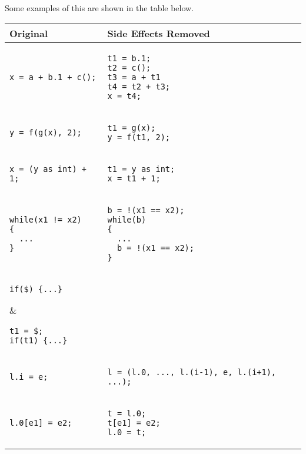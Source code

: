 \documentclass{llncs}
\providecommand{\tabularnewline}{\\}
\begin{document}
Some examples of this are shown in the table below.
\begin{center}
\begin{tabular}{|p{}|p{}|}
\hline 
\textbf{Original} & \textbf{Side Effects Removed} 
\tabularnewline
\hline \hline 
\begin{verbatim}
x = a + b.1 + c();
\end{verbatim} 
&
\begin{verbatim}
t1 = b.1;
t2 = c();   
t3 = a + t1
t4 = t2 + t3;
x = t4;
\end{verbatim}
\tabularnewline
\hline 

\begin{verbatim}
y = f(g(x), 2);
\end{verbatim} 
& 
\begin{verbatim}
t1 = g(x);
y = f(t1, 2);
\end{verbatim}
\tabularnewline
\hline 
\begin{verbatim}
x = (y as int) + 1;
\end{verbatim} 
& 
\begin{verbatim}
t1 = y as int;   
x = t1 + 1;
\end{verbatim}
\tabularnewline
\hline 
\begin{verbatim}
while(x1 != x2)
{ 
  ...
}
\end{verbatim}

& 
\begin{verbatim}
b = !(x1 == x2);   
while(b)
{
  ... 
  b = !(x1 == x2); 
} 
\end{verbatim}
\tabularnewline
\hline 
\begin{verbatim}
if($) {...}
\end{verbatim} 
& 
\begin{verbatim}
t1 = $;   
if(t1) {...}
\end{verbatim}
\tabularnewline
\hline 
\begin{verbatim}
l.i = e;
\end{verbatim} 
& 
\begin{verbatim}
l = (l.0, ..., l.(i-1), e, l.(i+1), ...);
\end{verbatim}
\tabularnewline
\hline 
\begin{verbatim}
l.0[e1] = e2;
\end{verbatim} 
& 
\begin{verbatim}
t = l.0;
t[e1] = e2;
l.0 = t;
\end{verbatim}
\tabularnewline
\hline
\end{tabular}
\end{center}
\end{document}
